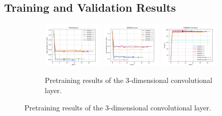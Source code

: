 \documentclass[./main.tex]{subfiles}
\begin{document}
\subsection{Training and Validation Results}
\begin{figure}[htbp]
    \centering
     \begin{subfigure}[b]{\textwidth}
         \centering
         \includegraphics[width=0.32\textwidth]{./entities/pretrained/baseline/train_losses.png}
         \includegraphics[width=0.32\textwidth]{./entities/pretrained/baseline/val_losses.png}
         \includegraphics[width=0.32\textwidth]{./entities/pretrained/baseline/val_accs.png}
         \caption{Pretraining results of the 3-dimensional convolutional layer.}
     \end{subfigure}
    \hfill


\end{figure}
\end{document}
